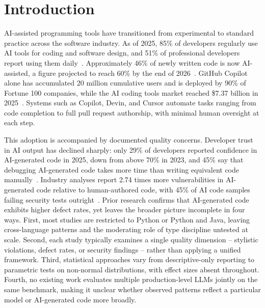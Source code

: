 \section{Introduction}
\label{sec:introduction}

AI-assisted programming tools have transitioned from experimental to standard practice across the software industry. As of 2025, 85\% of developers regularly use AI tools for coding and software design, and 51\% of professional developers report using them daily~\cite{modall2025}. Approximately 46\% of newly written code is now AI-assisted, a figure projected to reach 60\% by the end of 2026~\cite{modall2025}. GitHub Copilot alone has accumulated 20 million cumulative users and is deployed by 90\% of Fortune 100 companies, while the AI coding tools market reached \$7.37 billion in 2025~\cite{modall2025}. Systems such as Copilot, Devin, and Cursor automate tasks ranging from code completion to full pull request authorship, with minimal human oversight at each step.

This adoption is accompanied by documented quality concerns. Developer trust in AI output has declined sharply: only 29\% of developers reported confidence in AI-generated code in 2025, down from above 70\% in 2023, and 45\% say that debugging AI-generated code takes more time than writing equivalent code manually~\cite{modall2025}. Industry analyses report 2.74 times more vulnerabilities in AI-generated code relative to human-authored code, with 45\% of AI code samples failing security tests outright~\cite{modall2025}. Prior research confirms that AI-generated code exhibits higher defect rates, yet leaves the broader picture incomplete in four ways. First, most studies are restricted to Python or Python and Java, leaving cross-language patterns and the moderating role of type discipline untested at scale. Second, each study typically examines a single quality dimension -- stylistic violations, defect rates, or security findings -- rather than applying a unified framework. Third, statistical approaches vary from descriptive-only reporting to parametric tests on non-normal distributions, with effect sizes absent throughout. Fourth, no existing work evaluates multiple production-level LLMs jointly on the same benchmark, making it unclear whether observed patterns reflect a particular model or AI-generated code more broadly.

